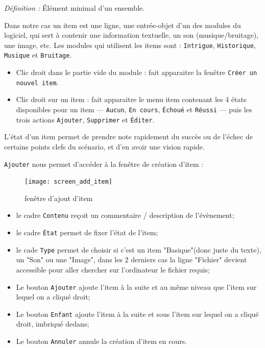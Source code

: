 \documentclass[a4paper,12pt]{article}
\newcommand*{\interfaceitem}[1]{\texttt{#1}}
\begin{document}
\emph{Définition : } Élément minimal d'un ensemble.

Dans notre cas un item est une ligne, une entrée-objet d'un des modules du logiciel, qui sert à contenir une information textuelle, un son (musique/bruitage), une image, etc.
Les modules qui utilisent les items sont : \interfaceitem{Intrigue}, \interfaceitem{Historique}, \interfaceitem{Musique} et \interfaceitem{Bruitage}.

\begin{itemize}
    \item Clic droit dans le partie vide du module : fait apparaitre la fenêtre \interfaceitem{Créer un nouvel item}.
    \item Clic droit sur un item : fait apparaitre le menu item contenant les 4 états disponibles pour un item --- \interfaceitem{Aucun}, \interfaceitem{En cours}, \interfaceitem{Échoué} et \interfaceitem{Réussi} --- puis les trois actions \interfaceitem{Ajouter}, \interfaceitem{Supprimer} et \interfaceitem{Éditer}.
\end{itemize}
L'état d'un item permet de prendre note rapidement du succès ou de l'échec de certains points clefs du scénario, et d'en avoir une vision rapide.

\interfaceitem{Ajouter} nous permet d'accéder à la fenêtre de création d'item :
\begin{figure}[h]
    \texttt{[image: screen\_add\_item]}
    \caption{fenêtre d'ajout d'item}
\end{figure}
\begin{itemize}
    \item le cadre \interfaceitem{Contenu} reçoit un commentaire / description de l'évènement;
    \item le cadre \interfaceitem{État} permet de fixer l'état de l'item;
    \item le cade \interfaceitem{Type} permet de choisir si c'est un item "Basique"(donc juste du texte), un "Son" ou une "Image", dans les 2 derniers cas la ligne "Fichier" devient accessible pour aller chercher sur l'ordinateur le fichier requis;
    \item Le bouton \interfaceitem{Ajouter} ajoute l'item à la suite et au même niveau que l'item sur lequel on a cliqué droit;
    \item Le bouton \interfaceitem{Enfant} ajoute l'item à la suite et sous l'item sur lequel on a cliqué droit, imbriqué dedans;
    \item Le bouton \interfaceitem{Annuler} annule la création d'item en cours.
\end{itemize}
\end{document}
